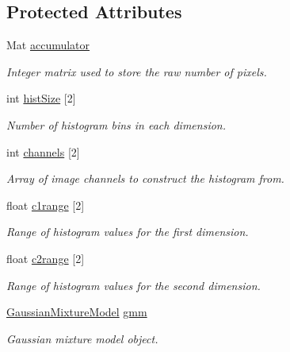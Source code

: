 \subsection*{\-Protected \-Attributes}
\begin{DoxyCompactItemize}
\item 
\-Mat \hyperlink{classHistogram_a2ab3cb1258570c69ef65261e63cd3d68}{accumulator}
\begin{DoxyCompactList}\small\item\em \-Integer matrix used to store the raw number of pixels. \end{DoxyCompactList}\item 
int \hyperlink{classHistogram_aaedf097871b566db37a9c3a8c4370367}{hist\-Size} \mbox{[}2\mbox{]}
\begin{DoxyCompactList}\small\item\em \-Number of histogram bins in each dimension. \end{DoxyCompactList}\item 
int \hyperlink{classHistogram_a2143ce56ddacb3295a8aa0e3ac8d06f7}{channels} \mbox{[}2\mbox{]}
\begin{DoxyCompactList}\small\item\em \-Array of image channels to construct the histogram from. \end{DoxyCompactList}\item 
float \hyperlink{classHistogram_a86b67a4ddc798541c12cb9402a65790b}{c1range} \mbox{[}2\mbox{]}
\begin{DoxyCompactList}\small\item\em \-Range of histogram values for the first dimension. \end{DoxyCompactList}\item 
float \hyperlink{classHistogram_a0279598c0cef21107554447bbbfe22b6}{c2range} \mbox{[}2\mbox{]}
\begin{DoxyCompactList}\small\item\em \-Range of histogram values for the second dimension. \end{DoxyCompactList}\item 
\hyperlink{classGaussianMixtureModel}{\-Gaussian\-Mixture\-Model} \hyperlink{classHistogram_a6006a95143aa084fd18e9db7c5525142}{gmm}
\begin{DoxyCompactList}\small\item\em \-Gaussian mixture model object. \end{DoxyCompactList}\end{DoxyCompactItemize}


